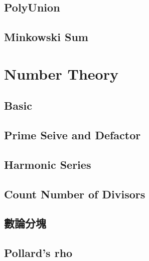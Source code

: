\documentclass[a4paper,10pt,twocolumn,oneside]{article}
\begin{document}
\subsection{PolyUnion}


% 

\subsection{Minkowski Sum}







\section{Number Theory}

\subsection{Basic}


\subsection{Prime Seive and Defactor}


\subsection{Harmonic Series}


\subsection{Count Number of Divisors}


\subsection{數論分塊}


\subsection{Pollard's rho}


\end{document}
